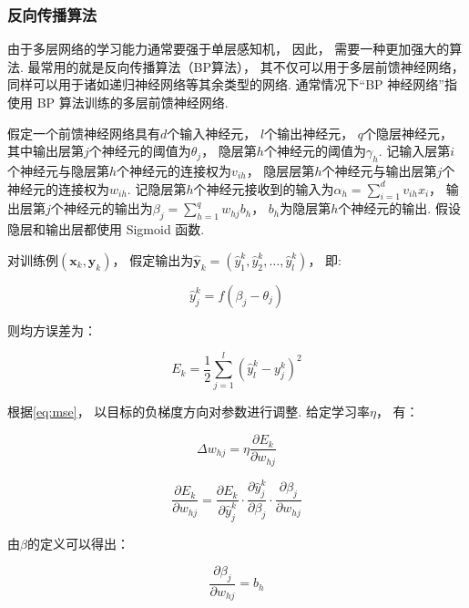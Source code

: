 \subsubsection{反向传播算法}

由于多层网络的学习能力通常要强于单层感知机，
因此，
需要一种更加强大的算法.
最常用的就是反向传播算法（BP算法），
其不仅可以用于多层前馈神经网络，
同样可以用于诸如递归神经网络等其余类型的网络.
通常情况下“BP 神经网络”指使用 BP 算法训练的多层前馈神经网络.

假定一个前馈神经网络具有$d$个输入神经元，
$l$个输出神经元，
$q$个隐层神经元，
其中输出层第$j$个神经元的阈值为$\theta_j$，
隐层第$h$个神经元的阈值为$\gamma_h$.
记输入层第$i$个神经元与隐层第$h$个神经元的连接权为$v_{ih}$，
隐层层第$h$个神经元与输出层第$j$个神经元的连接权为$w_{ih}$.
记隐层第$h$个神经元接收到的输入为$\alpha_h=\sum_{i=1}^d v_{ih}x_i$，
输出层第$j$个神经元的输出为$\beta_j=\sum_{h=1}^{q}{w_{hj}b_h}$，
$b_h$为隐层第$h$个神经元的输出.
假设隐层和输出层都使用 Sigmoid 函数.

对训练例$\left(\mathbf{x}_k, \mathbf{y}_k\right)$，
假定输出为$\hat{\mathbf{y}}_k=\left(\hat{y}_1^k, \hat{y}_2^k, \ldots, \hat{y}_l^k\right)$，
即:

\begin{equation}
    \label{eq:yjk}
    \hat{y}_j^k = f\left(\beta_j-\theta_j\right)
\end{equation}

则均方误差为：

\begin{equation}
    \label{eq:mse}
    E_k=\frac{1}{2}\sum_{j=1}^l{{\left(\hat{y}_l^k-y_j^k\right)}^2}
\end{equation}

根据\cref{eq:mse}，
以目标的负梯度方向对参数进行调整.
给定学习率$\eta$，
有：

\begin{equation}
    \Delta w_{hj}=\eta\frac{\partial{E_k}}{\partial{w_{hj}}}
\end{equation}

\begin{equation}
    \label{eq:partial}
    \frac{\partial{E_k}}{\partial{w_{hj}}}=\frac{\partial{E_k}}{\partial{\hat{y}_j^k}}\cdot\frac{\partial{\hat{y}_j^k}}{\partial{\beta_j}}\cdot\frac{\partial{\beta_j}}{\partial{w_{hj}}}
\end{equation}

由$\beta$的定义可以得出：

\begin{equation}
    \label{eq:b}
    \frac{\partial \beta_j}{\partial w_{hj}} = b_h
\end{equation}

